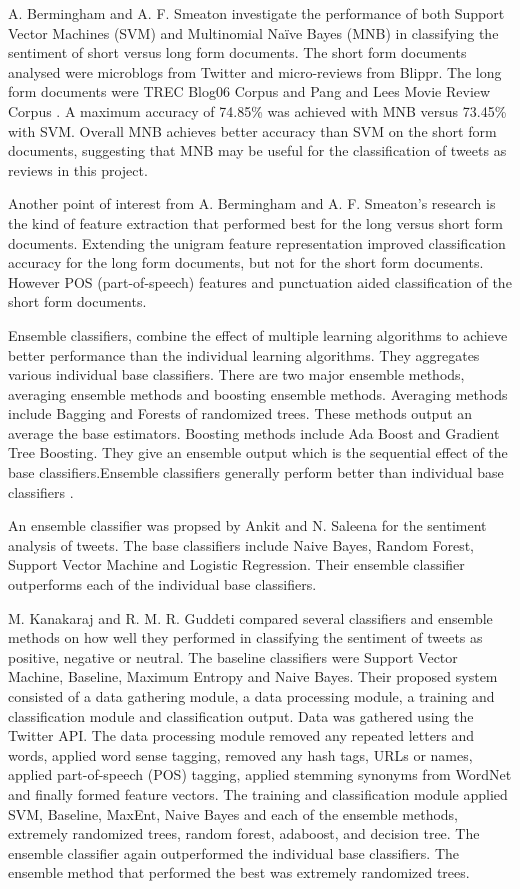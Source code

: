 A. Bermingham and A. F. Smeaton \cite{Berm2010} investigate the performance of both Support Vector Machines (SVM) and Multinomial Naïve Bayes (MNB) in classifying the sentiment of short versus long form documents. The short form documents analysed were microblogs from Twitter and micro-reviews from Blippr. The long form documents were TREC Blog06 Corpus and Pang and Lees Movie Review Corpus \cite{panglee2004}. A maximum accuracy of 74.85\% was achieved with MNB versus 73.45\% with SVM. Overall MNB achieves better accuracy than SVM on the short form documents, suggesting that MNB may be useful for the classification of tweets as reviews in this project.

Another point of interest from A. Bermingham and A. F. Smeaton's research is the kind of feature extraction that performed best for the long versus short form documents. Extending the unigram feature representation improved classification accuracy for the long form documents, but not for the short form documents. However POS (part-of-speech) features and punctuation aided classification of the short form documents. 

Ensemble classifiers, combine the effect of multiple learning algorithms to achieve better performance than the individual learning algorithms. They aggregates various individual base classifiers. There are two major ensemble methods, averaging ensemble methods and boosting ensemble methods. Averaging methods include Bagging and Forests of randomized trees. These methods output an average the base estimators. Boosting methods include Ada Boost and Gradient Tree Boosting. They give an ensemble output which is the sequential effect of the base classifiers.Ensemble classifiers generally perform better than individual base classifiers \cite{Opitz1999}. 

An ensemble classifier was propsed by Ankit and N. Saleena \cite{Ankit2018} for the sentiment analysis of tweets. The base classifiers include Naive Bayes, Random Forest, Support Vector Machine and Logistic Regression. Their ensemble classifier outperforms each of the individual base classifiers.

M. Kanakaraj and R. M. R. Guddeti \cite{Kanakaraj2015} compared several classifiers and ensemble methods on how well they performed in classifying the sentiment of tweets as positive, negative or neutral. The baseline classifiers were Support Vector Machine, Baseline, Maximum Entropy and Naive Bayes. Their proposed system consisted of a data gathering module, a data processing module, a training and classification module and classification output. Data was gathered using the Twitter API. The data processing module removed any repeated letters and words, applied word sense tagging, removed any hash tags, URLs or names, applied part-of-speech (POS) tagging, applied stemming synonyms from WordNet and finally formed feature vectors. The training and classification module applied SVM, Baseline, MaxEnt, Naive Bayes and each of the ensemble methods, extremely randomized trees, random forest, adaboost, and decision tree. The ensemble classifier again outperformed the individual base classifiers. The ensemble method that performed the best was extremely randomized trees. 

